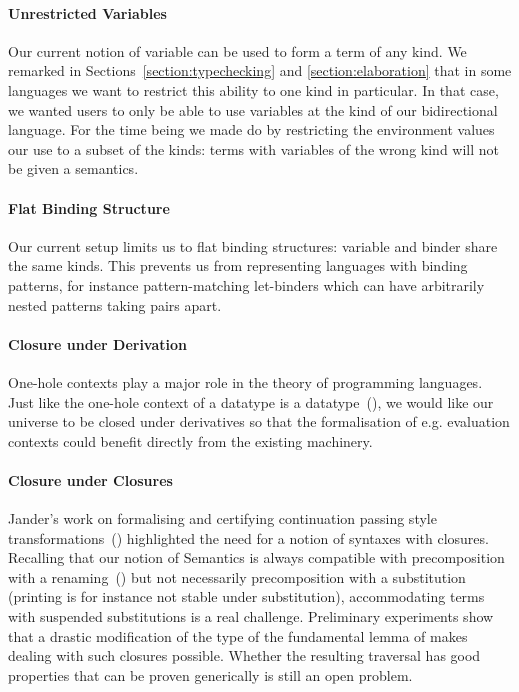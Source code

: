 \paragraph{Unrestricted Variables} Our current notion of variable can be used
to form a term of any kind. We remarked in Sections~\ref{section:typechecking}
and \ref{section:elaboration} that in some languages we want to restrict this
ability to one kind in particular. In that case, we wanted users to only be able
to use variables at the kind  of our bidirectional language. For the
time being we made do by restricting the environment values our 
use to a subset of the kinds: terms with variables of the wrong kind will not be
given a semantics.

\paragraph{Flat Binding Structure} Our current setup limits us to flat binding
structures: variable and binder share the same kinds. This prevents us from
representing languages with binding patterns, for instance pattern-matching
let-binders which can have arbitrarily nested patterns taking pairs apart.

\paragraph{Closure under Derivation} One-hole contexts play a major role in the
theory of programming languages. Just like the one-hole context of a datatype is
a datatype~(\cite{DBLP:journals/fuin/AbbottAMG05}), we would like our universe
to be closed under derivatives so that the formalisation of e.g. evaluation
contexts could benefit directly from the existing machinery.

\paragraph{Closure under Closures} Jander's work on formalising and certifying
continuation passing style transformations~(\cite{Jander:Thesis:2019})
highlighted the need for a notion of syntaxes with closures. Recalling
that our notion of Semantics is always compatible with precomposition
with a renaming~(\cite{Kaiser-wsdebr}) but not necessarily
precomposition with a substitution (printing is for instance not
stable under substitution), accommodating terms with suspended
substitutions is a real challenge. Preliminary experiments show that a
drastic modification of the type of the fundamental lemma of
 makes dealing with such closures possible. Whether the
resulting traversal has good properties that can be proven generically
is still an open problem.


